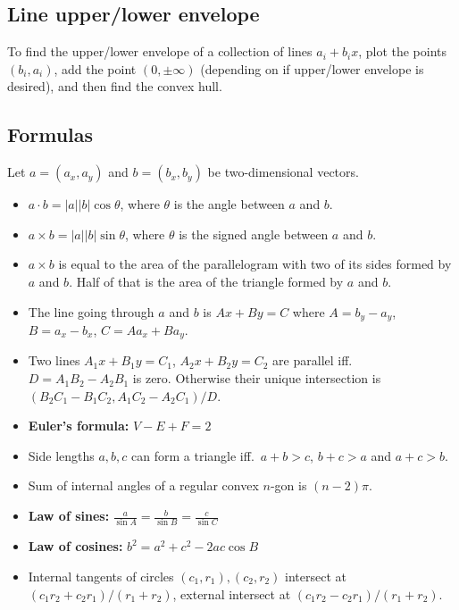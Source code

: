 \documentclass[8pt,a4paper,landscape,oneside]{amsart}
\begin{document}
\begin{multicols*}{3}
    \subsection{Line upper/lower envelope}
        To find the upper/lower envelope of a collection of lines $a_i+b_i x$,
        plot the points $(b_i,a_i)$, add the point $(0,\pm \infty)$ (depending
        on if upper/lower envelope is desired), and then find the convex hull.

    \subsection{Formulas}
        Let $a = (a_x, a_y)$ and $b = (b_x, b_y)$ be two-dimensional vectors.
        \begin{itemize}
            \item $a\cdot b = |a||b|\cos{\theta}$, where $\theta$ is the angle
                between $a$ and $b$.
            \item $a\times b = |a||b|\sin{\theta}$, where $\theta$ is the
                signed angle between $a$ and $b$.
            \item $a\times b$ is equal to the area of the parallelogram with
                two of its sides formed by $a$ and $b$. Half of that is the
                area of the triangle formed by $a$ and $b$.
            \item The line going through $a$ and $b$ is $Ax+By=C$ where $A=b_y-a_y$, $B=a_x-b_x$, $C=Aa_x+Ba_y$.
            \item Two lines $A_1x+B_1y=C_1$, $A_2x+B_2y=C_2$ are parallel iff.\ $D=A_1B_2-A_2B_1$ is zero. Otherwise their unique intersection is $(B_2C_1-B_1C_2,A_1C_2-A_2C_1)/D$.
            \item \textbf{Euler's formula:} $V - E + F = 2$
            \item Side lengths $a,b,c$ can form a triangle iff.\ $a+b>c$, $b+c>a$ and $a+c>b$.
            \item Sum of internal angles of a regular convex $n$-gon is $(n-2)\pi$.
            \item \textbf{Law of sines:} $\frac{a}{\sin A} = \frac{b}{\sin B} = \frac{c}{\sin C}$
            \item \textbf{Law of cosines:} $b^2 = a^2 + c^2 - 2ac\cos B$
            \item Internal tangents of circles $(c_1,r_1), (c_2,r_2)$ intersect at $(c_1r_2+c_2r_1)/(r_1+r_2)$, external intersect at $(c_1r_2-c_2r_1)/(r_1+r_2)$.
        \end{itemize}



\end{multicols*}
\end{document}
